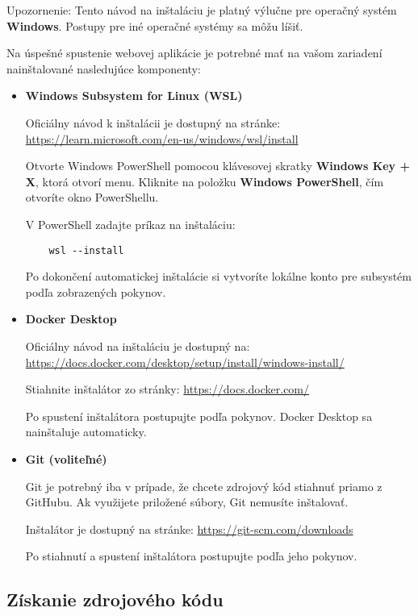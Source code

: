 Upozornenie: Tento návod na inštaláciu je platný výlučne pre operačný systém \textbf{Windows}. Postupy pre iné operačné systémy sa môžu líšiť.

Na úspešné spustenie webovej aplikácie je potrebné mať na vašom zariadení nainštalované nasledujúce komponenty:

\begin{itemize}
    \item \textbf{Windows Subsystem for Linux (WSL)}

    Oficiálny návod k inštalácii je dostupný na stránke:
    \url{https://learn.microsoft.com/en-us/windows/wsl/install}

    Otvorte Windows PowerShell pomocou klávesovej skratky \textbf{Windows Key + X}, ktorá otvorí menu. Kliknite na položku \textbf{Windows PowerShell}, čím otvoríte okno PowerShellu.

    V PowerShell zadajte príkaz na inštaláciu:
    \begin{verbatim}
    wsl --install
    \end{verbatim}

    Po dokončení automatickej inštalácie si vytvoríte lokálne konto pre subsystém podľa zobrazených pokynov.

    \item \textbf{Docker Desktop}

    Oficiálny návod na inštaláciu je dostupný na:
    \url{https://docs.docker.com/desktop/setup/install/windows-install/}

    Stiahnite inštalátor zo stránky:
    \url{https://docs.docker.com/}

    Po spustení inštalátora postupujte podľa pokynov. Docker Desktop sa nainštaluje automaticky.

    \item \textbf{Git (voliteľné)}

    Git je potrebný iba v prípade, že chcete zdrojový kód stiahnuť priamo z GitHubu. Ak využijete priložené súbory, Git nemusíte inštalovať.

    Inštalátor je dostupný na stránke:
    \url{https://git-scm.com/downloads}

    Po stiahnutí a spustení inštalátora postupujte podľa jeho pokynov.
\end{itemize}

\subsection*{Získanie zdrojového kódu}


